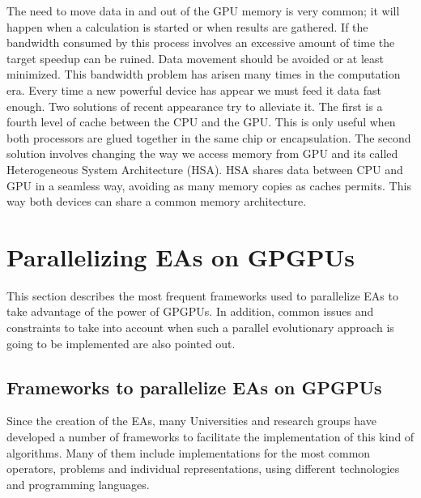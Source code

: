 \documentclass{article}
\begin{document}
The need to move data in and out of the GPU memory is very common; it
will happen when a calculation is started or when results are
gathered. If the bandwidth consumed by this process involves an
excessive amount of time the target speedup can be ruined. Data
movement should be avoided or at least minimized. This bandwidth
problem has arisen many times in the computation era. %
Every time a new
powerful device has appear we must feed it  data fast enough. Two
solutions of recent appearance try to alleviate it. The first is a
fourth level of cache between the CPU and the GPU. %
This is only useful
when both processors are glued together in the same chip or
encapsulation. The second solution involves changing the way we access
memory from GPU and its called Heterogeneous System Architecture
(HSA). %
HSA shares data between CPU and GPU in a seamless way, avoiding
as many memory copies as caches permits. This way both devices can
share a common memory architecture.


\section{Parallelizing EAs on GPGPUs}
\label{sec:parallelizing}


This section describes the most frequent frameworks used to
parallelize EAs to take advantage of the power of GPGPUs. In addition,
common issues and constraints to take into account when such a
parallel evolutionary approach is going to be implemented are also
pointed out. 

\subsection{Frameworks to parallelize EAs on GPGPUs}

Since the creation of the EAs, many Universities and research groups have developed a number of frameworks to facilitate the implementation of this kind of algorithms. Many of them include implementations for the most common operators, problems and individual representations, using different technologies and programming languages.
\end{document}
